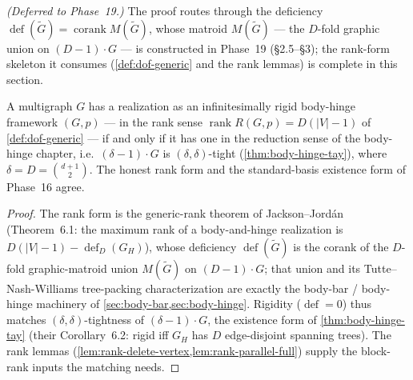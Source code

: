 \begin{proposition}
  \label{prop:rigidity-matrix-prop11}
  \emph{(Deferred to Phase~19.)} The proof routes through the
  deficiency $\operatorname{def}(\tilde G) = \operatorname{corank}
  M(\tilde G)$, whose matroid $M(\tilde G)$ --- the $D$-fold graphic
  union on $(D-1)\cdot G$ --- is constructed in Phase~19 (\S2.5--\S3);
  the rank-form skeleton it consumes (\cref{def:dof-generic} and the
  rank lemmas) is complete in this section.

  A multigraph $G$ has a realization as an infinitesimally rigid
  body-hinge framework $(G,p)$ --- in the rank sense
  $\operatorname{rank} R(G,p) = D(|V|-1)$ of \cref{def:dof-generic} ---
  if and only if it has one in the reduction sense of the body-hinge
  chapter, i.e.\ $(\delta-1)\cdot G$ is $(\delta,\delta)$-tight
  (\cref{thm:body-hinge-tay}), where $\delta = D = \binom{d+1}{2}$. The
  honest rank form and the standard-basis existence form of Phase~16
  agree.
\end{proposition}
\begin{proof}
  The rank form is the generic-rank theorem of
  Jackson--Jordán~\cite{jacksonJordan2009} (Theorem~6.1: the maximum rank
  of a body-and-hinge realization is $D(|V|-1) - \operatorname{def}_D(G_H)$),
  whose deficiency $\operatorname{def}(\tilde G)$
  is the corank of the $D$-fold graphic-matroid union $M(\tilde G)$ on
  $(D-1)\cdot G$; that union and its Tutte--Nash-Williams tree-packing
  characterization are exactly the body-bar / body-hinge machinery of
  \cref{sec:body-bar,sec:body-hinge}. Rigidity ($\operatorname{def} = 0$)
  thus matches $(\delta,\delta)$-tightness of $(\delta-1)\cdot G$, the
  existence form of \cref{thm:body-hinge-tay} (their Corollary~6.2: rigid
  iff $G_H$ has $D$ edge-disjoint spanning trees). The rank lemmas
  (\cref{lem:rank-delete-vertex,lem:rank-parallel-full}) supply the
  block-rank inputs the matching needs.
\end{proof}

